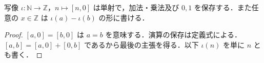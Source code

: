\begin{prop}[自然数の整数への埋込み]
写像 $\iota:\mathbb N\to\mathbb Z$，$n\mapsto[n,0]$ は単射で，加法・乗法及び $0,1$ を保存する．また任意の $x\in\mathbb Z$ は $\iota(a)-\iota(b)$ の形に書ける．
\end{prop}
\begin{proof}
$[a,0]=[b,0]$ は $a=b$ を意味する．演算の保存は定義式による．$[a,b]=[a,0]+[0,b]$ であるから最後の主張を得る．以下 $\iota(n)$ を単に $n$ とも書く．
\end{proof}
